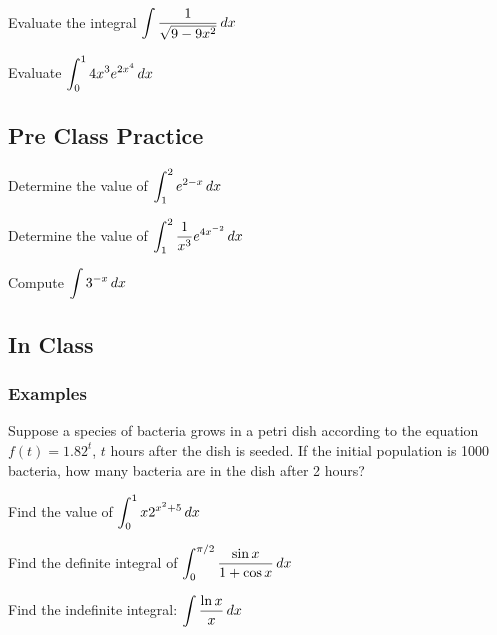 \documentclass[notes]{subfiles}
\begin{document}
		\begin{ex}
			Evaluate the integral \(\displaystyle \int \dfrac{1}{\sqrt{9-9x^2}}\, dx\)
		\end{ex}
		
		\begin{ex}
			Evaluate \(\displaystyle \int_0^1 4x^3 e^{2x^4}\, dx\)
		\end{ex}
			\newpage
			
	\subsection*{Pre Class Practice}
		\begin{ex}
			Determine the value of \(\displaystyle \int_1^2 e^{2-x}\, dx\)
		\end{ex}
		
		\begin{ex}
			Determine the value of \(\displaystyle \int_1^2 \dfrac{1}{x^3} e^{4x^{-2}}\, dx\)
		\end{ex}
		
		\begin{ex}
			Compute \(\displaystyle \int 3^{-x}\, dx\)
		\end{ex}
			\newpage
			
	\subsection*{In Class}		
	\subsubsection*{Examples}
		\begin{ex}
			Suppose a species of bacteria grows in a petri dish according to the equation \(f(t) = 1.82^t\), \(t\) hours after the dish is seeded. If the initial population is 1000 bacteria, how many bacteria are in the dish after 2 hours?
		\end{ex}
			
		\begin{ex}
			Find the value of \(\displaystyle \int_0^1 x2^{x^2 + 5}\, dx\)
		\end{ex}
			
		\begin{ex}
			Find the definite integral of \(\displaystyle \int_0^{\pi/2} \dfrac{\sin x}{1+\cos x}\, dx\)
		\end{ex}
			\newpage
			
		\begin{ex}
			Find the indefinite integral: \(\displaystyle \int \dfrac{\ln x}{x}\, dx\)
		\end{ex}
			
\end{document}
